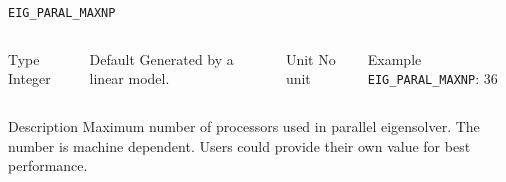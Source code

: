 \begin{frame}[allowframebreaks]{\texttt{EIG\_PARAL\_MAXNP}} \label{EIG_PARAL_MAXNP}
\vspace*{-12pt}
\begin{columns}
\begin{block}{Type}
Integer
\end{block}

\begin{block}{Default}
Generated by a linear model.
\end{block}

\begin{block}{Unit}
No unit
\end{block}

\begin{block}{Example}
\texttt{EIG\_PARAL\_MAXNP}: 36
\end{block}
\end{columns}

\begin{block}{Description}
Maximum number of processors used in parallel eigensolver. The number is machine dependent. Users could provide their own value for best performance. 
\end{block}

\end{frame}
